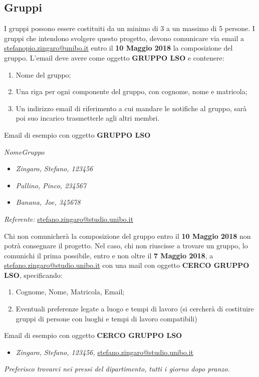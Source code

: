 \documentclass[12pt,a4paper,draft]{article}
\begin{document}
\subsection{Gruppi}
%
I gruppi possono essere costituiti da un minimo di 3 a un massimo di 5 persone. 
I gruppi che intendono svolgere questo progetto, devono comunicare via email a \url{stefanopio.zingaro@unibo.it} entro il \textbf{10 Maggio 2018} la composizione del gruppo. 
L'email deve avere come oggetto \textbf{GRUPPO LSO} e contenere:
\begin{enumerate}
    \item Nome del gruppo;
    \item Una riga per ogni componente del gruppo, con cognome, nome e matricola;
    \item Un indirizzo email di riferimento a cui mandare le notifiche al gruppo, sarà poi suo incarico trasmetterle agli altri membri.
\end{enumerate}
Email di esempio con oggetto \textbf{GRUPPO LSO}

\noindent\textit{NomeGruppo}
\begin{itemize}
    \item \textit{Zingaro, Stefano, 123456}
    \item \textit{Pallino, Pinco, 234567}
    \item \textit{Banana, Joe, 345678}
\end{itemize}
\textit{Referente:} \url{stefano.zingaro@studio.unibo.it}

Chi non comunicherà la composizione del gruppo entro il \textbf{10 Maggio 2018} non potrà consegnare il progetto. 
Nel caso, chi non riuscisse a trovare un gruppo, lo comunichi il prima possibile, entro e non oltre il \textbf{7 Maggio 2018}, a \url{stefano.zingaro@studio.unibo.it} con una mail con oggetto \textbf{CERCO GRUPPO LSO}, specificando:
\begin{enumerate}
    \item Cognome, Nome, Matricola, Email;
    \item Eventuali preferenze legate a luogo e tempi di lavoro (si cercherà di costituire gruppi di persone con luoghi e tempi di lavoro compatibili)
\end{enumerate}
Email di esempio con oggetto \textbf{CERCO GRUPPO LSO} 
\begin{itemize}
    \item \textit{Zingaro, Stefano, 123456,} \url{stefano.zingaro@studio.unibo.it}
\end{itemize}
\textit{Preferisco trovarci nei pressi del dipartimento, tutti i giorno dopo pranzo.}
\end{document}
